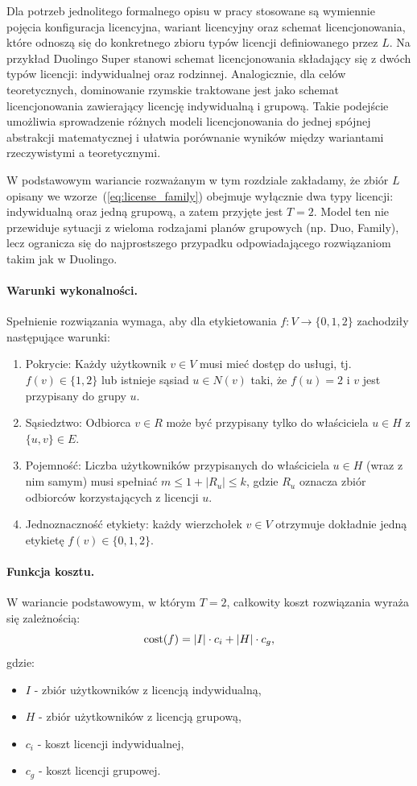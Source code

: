 Dla potrzeb jednolitego formalnego opisu w pracy stosowane są wymiennie pojęcia konfiguracja licencyjna, wariant licencyjny oraz schemat licencjonowania, które odnoszą się do konkretnego zbioru typów licencji definiowanego przez $L$. Na przykład Duolingo Super stanowi schemat licencjonowania składający się z dwóch typów licencji: indywidualnej oraz rodzinnej. Analogicznie, dla celów teoretycznych, dominowanie rzymskie traktowane jest jako schemat licencjonowania zawierający licencję indywidualną i grupową. Takie podejście umożliwia sprowadzenie różnych modeli licencjonowania do jednej spójnej abstrakcji matematycznej i ułatwia porównanie wyników między wariantami rzeczywistymi a teoretycznymi.

W podstawowym wariancie rozważanym w tym rozdziale zakładamy, że zbiór $L$ opisany we wzorze~(\ref{eq:license_family}) obejmuje wyłącznie dwa typy licencji: indywidualną oraz jedną grupową, a zatem przyjęte jest $T = 2$. Model ten nie przewiduje sytuacji z wieloma rodzajami planów grupowych (np. Duo, Family), lecz ogranicza się do najprostszego przypadku odpowiadającego rozwiązaniom takim jak w Duolingo.

\paragraph{Warunki wykonalności.}
Spełnienie rozwiązania wymaga, aby dla etykietowania $f:V\to\{0,1,2\}$ zachodziły następujące warunki:
\begin{enumerate}
  \item Pokrycie: Każdy użytkownik $v \in V$ musi mieć dostęp do usługi, tj. $f(v)\in\{1,2\}$ lub istnieje sąsiad $u\in N(v)$ taki, że $f(u)=2$ i $v$ jest przypisany do grupy $u$.
  \item Sąsiedztwo: Odbiorca $v\in R$ może być przypisany tylko do właściciela $u\in H$ z $\{u,v\}\in E$.
  \item Pojemność: Liczba użytkowników przypisanych do właściciela $u\in H$ (wraz z nim samym) musi spełniać $m \le 1+|R_u| \le k$, gdzie $R_u$ oznacza zbiór odbiorców korzystających z licencji $u$.
  \item Jednoznaczność etykiety: każdy wierzchołek $v\in V$ otrzymuje dokładnie jedną etykietę $f(v)\in\{0,1,2\}$.
\end{enumerate}


\paragraph{Funkcja kosztu.}
W wariancie podstawowym, w którym $T=2$, całkowity koszt rozwiązania wyraża się zależnością:
\begin{equation}
  \operatorname{cost}(f) = |I|\cdot c_i + |H|\cdot c_g ,
  \label{eq:cost_function}
\end{equation}
gdzie:
\begin{itemize}
  \item $I$ - zbiór użytkowników z licencją indywidualną,
  \item $H$ - zbiór użytkowników z licencją grupową,
  \item $c_i$ - koszt licencji indywidualnej,
  \item $c_g$ - koszt licencji grupowej.
\end{itemize}


